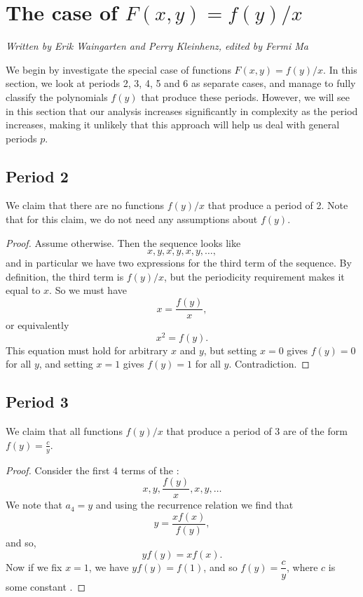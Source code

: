 \documentclass[12pt]{article}
\begin{document}
\section{The case of $F(x,y) = f(y)/x$}
\label{f(y)/x case}
\emph{Written by Erik Waingarten and Perry Kleinhenz, edited by Fermi Ma}

We begin by investigate the special case of functions $F(x,y) = f(y)/x$. In this section, we look at periods 2, 3, 4, 5 and 6 as separate cases, and manage to fully classify the polynomials $f(y)$ that produce these periods. However, we will see in this section that our analysis increases significantly in complexity as the period increases, making it unlikely that this approach will help us deal with general periods $p$.

\subsection{Period 2}

We claim that there are no functions $f(y)/x$ that produce a period of 2. Note that for this claim, we do not need any assumptions about $f(y)$.

\begin{proof}
Assume otherwise. Then the sequence looks like
\[ x,y,x,y,x,y,\dots , \]
and in particular we have two expressions for the third term of the sequence. By definition, the third term is $f(y)/x$, but the periodicity requirement makes it equal to $x$. So we must have
\begin{equation*}
x = \frac{f(y)}{x},
\end{equation*}
or equivalently
\begin{equation*}
x^2 = f(y).
\end{equation*}
This equation must hold for arbitrary $x$ and $y$, but setting $x = 0$ gives $f(y) = 0$ for all $y$, and setting $x = 1$ gives $f(y) = 1$ for all $y$. Contradiction.
\end{proof}

\subsection{Period 3}

We claim that all functions $f(y)/x$ that produce a period of 3 are of the form $f(y) = \frac{c}{y}$. 

\begin{proof}
Consider the first 4 terms of the :
\begin{equation*}
x, y, \dfrac{f(y)}{x}, x, y, \dots 
\end{equation*}
We note that $a_4=y$ and using the recurrence relation we find that 
\begin{equation*}
y = \dfrac{xf(x)}{f(y)},
\end{equation*}
and so,
\begin{equation*} 
y f(y) = x f(x).
\end{equation*}
Now if we fix $x = 1$, we have $y f(y) = f(1)$, and so $f(y) = \dfrac{c}{y}$, where $c$ is some constant .
\end{proof}
\end{document}
